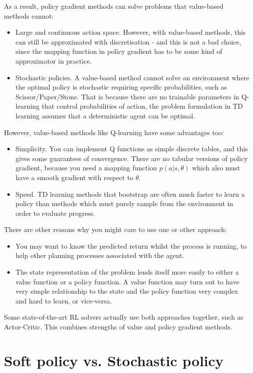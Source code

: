 \documentclass[lang=en,mode=normal,device=normal,color=blue,12pt]{elegantnote}
\DeclareMathOperator*{\1}{\mathbbm{1}}
\begin{document}
\begin{appendices}
As a result, policy gradient methods can solve problems that value-based methods cannot:
\begin{itemize}
\item Large and continuous action space. However, with value-based methods, this can still be approximated with discretisation - and this is not a bad choice, since the mapping function in policy gradient has to be some kind of approximator in practice.
\item Stochastic policies. A value-based method cannot solve an environment where the optimal policy is stochastic requiring specific probabilities, such as Scissor/Paper/Stone. That is because there are no trainable parameters in Q-learning that control probabilities of action, the problem formulation in TD learning assumes that a deterministic agent can be optimal.
\end{itemize}
However, value-based methods like Q-learning have some advantages too:
\begin{itemize}
\item Simplicity. You can implement Q functions as simple discrete tables, and this gives some guarantees of convergence. There are no tabular versions of policy gradient, because you need a mapping function $p(a|s,\theta)$ which also must have a smooth gradient with respect to $\theta$.
\item Speed. TD learning methods that bootstrap are often much faster to learn a policy than methods which must purely sample from the environment in order to evaluate progress.
\end{itemize}
There are other reasons why you might care to use one or other approach:
\begin{itemize}
\item You may want to know the predicted return whilst the process is running, to help other planning processes associated with the agent.
\item The state representation of the problem lends itself more easily to either a value function or a policy function. A value function may turn out to have very simple relationship to the state and the policy function very complex and hard to learn, or vice-versa.
\end{itemize}

Some state-of-the-art RL solvers actually use both approaches together, such as Actor-Critic. This combines strengths of value and policy gradient methods.



\section{Soft policy vs. Stochastic policy}


\end{appendices}
\end{document}
